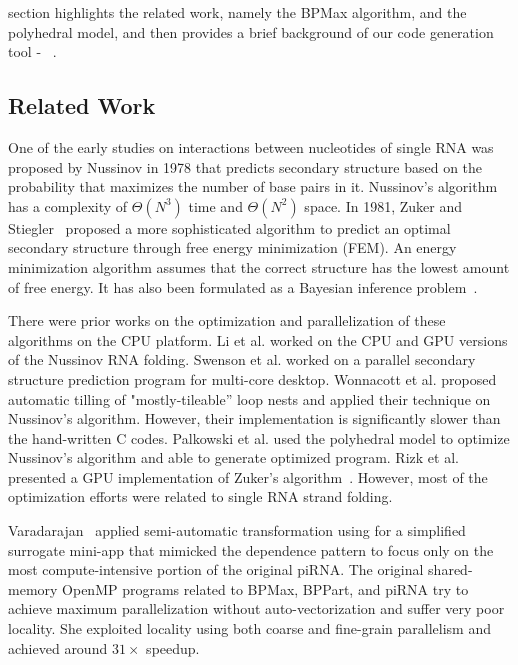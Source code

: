  section highlights the related work, namely the BPMax algorithm, and the polyhedral model, and then provides a brief background of our code generation tool - \alphaz\ .

\subsection{Related Work}
One of the early studies on interactions between nucleotides of single RNA was proposed by Nussinov\cite{Nussinov1978} in 1978 that predicts secondary structure based on the probability that maximizes the number of base pairs in it. Nussinov's algorithm has a complexity of $\Theta(N^3)$ time and $\Theta(N^2)$ space. In 1981, Zuker and Stiegler~\cite{Zuker1981} proposed 
a more sophisticated algorithm to predict an optimal secondary structure through free energy minimization (FEM). An energy minimization algorithm assumes that the correct structure has the lowest amount of free energy.  It has also been formulated as a Bayesian inference problem~\cite{Ding1999}.


There were prior works on the optimization and parallelization of these algorithms on the CPU platform. Li et al.\cite{Li2013} worked on the CPU and GPU versions of the Nussinov\cite{Nussinov1978} RNA folding. Swenson et al. \cite{Swenson2012}  worked on a parallel secondary structure prediction program for multi-core desktop. Wonnacott et al. \cite{Wonnacott2015} proposed automatic tilling of "mostly-tileable” loop nests and applied their technique on Nussinov’s algorithm. However, their implementation is significantly slower than the hand-written C codes. Palkowski et al. \cite{Palkowski2019} used the polyhedral model to optimize Nussinov's\cite{Nussinov1978} algorithm and able to generate optimized program. Rizk et al.~\cite{Rizk2011} presented a GPU implementation of Zuker’s algorithm~\cite{Zuker1981}. However, most of the optimization efforts were related to single RNA strand folding. 


Varadarajan~\cite{Varadarajan2016, Varadarajan2019} applied semi-automatic transformation using  \textbf{\alphaz} for a simplified surrogate mini-app that mimicked the dependence pattern to focus only on the most compute-intensive portion of the original piRNA. The original shared-memory OpenMP programs related to BPMax, BPPart, and piRNA try to achieve maximum parallelization without auto-vectorization and suffer very poor locality. She exploited locality using both coarse and fine-grain parallelism and achieved around $31 \times$ speedup.  

